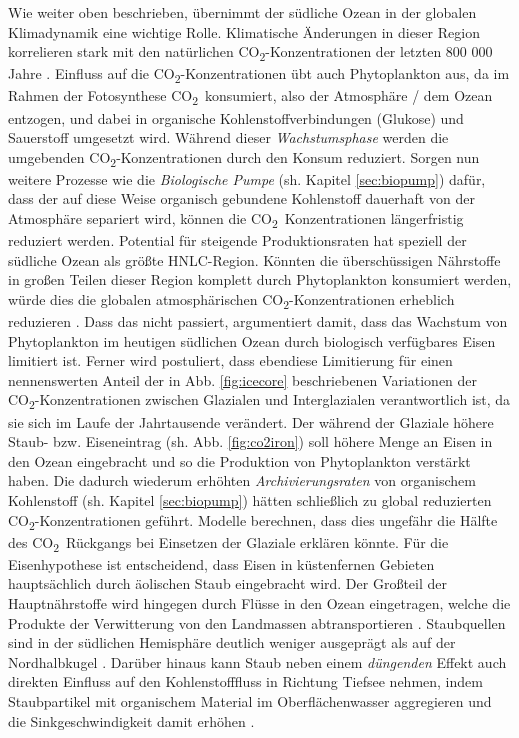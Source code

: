 \documentclass[12pt,a4paper,onecolumn,headheight=30pt]{scrartcl}
\newcommand{\cotwo}{CO\textsubscript{2}}
\begin{document}
Wie weiter oben beschrieben, übernimmt der südliche Ozean in der globalen Klimadynamik eine wichtige Rolle. Klimatische Änderungen in dieser Region korrelieren stark mit den natürlichen \cotwo -Konzentrationen der letzten 800 000 Jahre \citep{Fischer.2010}. Einfluss auf die \cotwo -Konzentrationen übt auch Phytoplankton aus, da im Rahmen der Fotosynthese \cotwo \ konsumiert, also der Atmosphäre / dem Ozean entzogen, und dabei in organische Kohlenstoffverbindungen (Glukose) und Sauerstoff umgesetzt wird. Während dieser \textit{Wachstumsphase} werden die umgebenden \cotwo -Konzentrationen durch den Konsum reduziert. Sorgen nun weitere Prozesse wie die \textit{Biologische Pumpe} (sh. Kapitel \ref{sec:biopump}) dafür, dass der auf diese Weise organisch gebundene Kohlenstoff dauerhaft von der Atmosphäre separiert wird, können die \cotwo \ Konzentrationen längerfristig reduziert werden. Potential für steigende Produktionsraten hat speziell der südliche Ozean als größte HNLC-Region. Könnten die überschüssigen Nährstoffe in großen Teilen dieser Region komplett durch Phytoplankton konsumiert werden, würde dies die globalen atmosphärischen \cotwo -Konzentrationen erheblich reduzieren \citep{Martin.1990}. Dass das nicht passiert, argumentiert \citet{Martin.1990} damit, dass das Wachstum von Phytoplankton im heutigen südlichen Ozean durch biologisch verfügbares Eisen limitiert ist. Ferner wird postuliert, dass ebendiese Limitierung für einen nennenswerten Anteil der in Abb. \ref{fig:icecore} beschriebenen Variationen der \cotwo -Konzentrationen zwischen Glazialen und Interglazialen verantwortlich ist, da sie sich im Laufe der Jahrtausende verändert. Der während der Glaziale höhere Staub- bzw. Eiseneintrag (sh. Abb. \ref{fig:co2iron}) soll höhere Menge an Eisen in den Ozean eingebracht und so die Produktion von Phytoplankton verstärkt haben. Die dadurch wiederum erhöhten \textit{Archivierungsraten} von organischem Kohlenstoff (sh. Kapitel \ref{sec:biopump}) hätten schließlich zu global reduzierten \cotwo -Konzentrationen geführt. Modelle berechnen, dass dies ungefähr die Hälfte des \cotwo \ Rückgangs bei Einsetzen der Glaziale erklären könnte. Für die Eisenhypothese ist entscheidend, dass Eisen in küstenfernen Gebieten hauptsächlich durch äolischen Staub eingebracht wird. Der Großteil der Hauptnährstoffe wird hingegen durch Flüsse in den Ozean eingetragen, welche die Produkte der Verwitterung von den Landmassen abtransportieren \citep{Emerson.2009}. Staubquellen sind in der südlichen Hemisphäre deutlich weniger ausgeprägt als auf der Nordhalbkugel \citep{Shao.2011}. Darüber hinaus kann Staub neben einem \textit{düngenden} Effekt auch direkten Einfluss auf den Kohlenstofffluss in Richtung Tiefsee nehmen, indem Staubpartikel mit organischem Material im Oberflächenwasser aggregieren und die Sinkgeschwindigkeit damit erhöhen \citep{vanderJagt.2018}.
\end{document}
